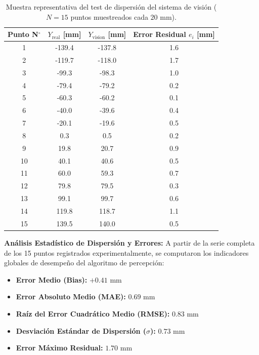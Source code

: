 \documentclass[12pt, a4paper]{report}
\begin{document}
\begin{table}[H]
\centering
\small
\begin{tabular}{|c|c|c|c|}
\hline
\textbf{Punto N$^\circ$} & \textbf{$Y_{\text{real}}$ [mm]} & \textbf{$Y_{\text{vision}}$ [mm]} & \textbf{Error Residual $e_i$ [mm]} \\ \hline
1  & -139.4 & -137.8 & 1.6 \\ \hline
2  & -119.7 & -118.0  & 1.7 \\ \hline
3 & -99.3  & -98.3  & 1.0 \\ \hline
4 & -79.4    & -79.2   & 0.2 \\ \hline
5 & -60.3 & -60.2  & 0.1 \\ \hline
6 & -40.0 & -39.6 & 0.4 \\ \hline
7 & -20.1 & -19.6 & 0.5 \\ \hline
8  & 0.3 & 0.5 & 0.2 \\ \hline
9  & 19.8 & 20.7  & 0.9 \\ \hline
10 & 40.1  & 40.6  & 0.5 \\ \hline
11 & 60.0    & 59.3   & 0.7 \\ \hline
12 & 79.8  & 79.5  & 0.3 \\ \hline
13 & 99.1 & 99.7 & 0.6 \\ \hline
14 & 119.8 & 118.7 & 1.1 \\ \hline
15 & 139.5 & 140.0 & 0.5 \\ \hline
\end{tabular}
\caption{Muestra representativa del test de dispersión del sistema de visión ($N = 15$ puntos muestreados cada $20\text{ mm}$).}
\label{tab:test_vision_dispersion}
\end{table}

\textbf{Análisis Estadístico de Dispersión y Errores:}
A partir de la serie completa de los 15 puntos registrados experimentalmente, se computaron los indicadores globales de desempeño del algoritmo de percepción:
\begin{itemize}
    \item \textbf{Error Medio (Bias):} $+0.41\text{ mm}$
    \item \textbf{Error Absoluto Medio (MAE):} $0.69\text{ mm}$
    \item \textbf{Raíz del Error Cuadrático Medio (RMSE):} $0.83\text{ mm}$
    \item \textbf{Desviación Estándar de Dispersión ($\sigma$):} $0.73\text{ mm}$
    \item \textbf{Error Máximo Residual:} $1.70\text{ mm}$
\end{itemize}
\end{document}
